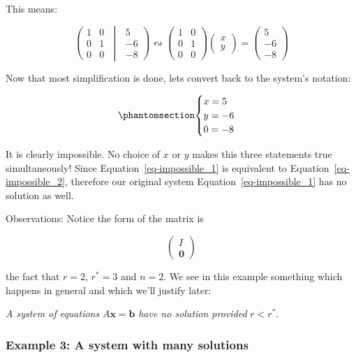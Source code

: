 \documentclass[
  letterpaper,
  DIV=11,
  numbers=noendperiod]{scrartcl}
\theoremstyle{definition}
\theoremstyle{remark}
\begin{document}
This means:

\[
\left(\begin{matrix}1 & 0 \\0 & 1 \\0 & 0 \end{matrix} \;\middle|\;\begin{matrix}5\\-6\\-8\end{matrix}\right)
\leftrightsquigarrow
\begin{pmatrix}1 & 0 \\0 & 1 \\0 & 0 \end{pmatrix} \begin{pmatrix}x\\y\end{pmatrix}=\begin{pmatrix}5\\-6\\-8\end{pmatrix}
\]

Now that most simplification is done, lets convert back to the system's
notation:

\begin{equation}\phantomsection\label{eq-impossible_2}{
\begin{cases}
x=5\\
y=-6\\
0=-8
\end{cases}
}\end{equation}

It is clearly impossible. No choice of \(x\) or \(y\) makes this three
statements true simultaneously! Since Equation~\ref{eq-impossible_1} is
equivalent to Equation~\ref{eq-impossible_2}, therefore our original
system Equation~\ref{eq-impossible_1} has no solution as well.

Observations: Notice the form of the matrix is

\[
\begin{pmatrix}I\\\mathbf{0}\end{pmatrix}
\]

the fact that \(r=2\), \(r^*=3\) and \(n=2\). We see in this example
something which happens in general and which we'll justify later:

\emph{A system of equations} \(A\mathbf{x}=\mathbf{b}\) \emph{have no
solution provided} \(r<r^*\).

\subsubsection{Example 3: A system with many
solutions}\label{example-3-a-system-with-many-solutions}
\end{document}
